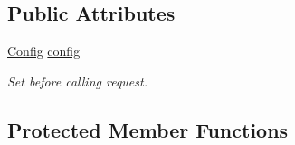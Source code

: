 \subsection*{Public Attributes}
\begin{DoxyCompactItemize}
\item 
\mbox{\label{classhttp_1_1_client_base_a3810388b54d19e5f020d3eca8d08d470}} 
\hyperlink{classhttp_1_1_client_base_1_1_config}{Config} \hyperlink{classhttp_1_1_client_base_a3810388b54d19e5f020d3eca8d08d470}{config}
\begin{DoxyCompactList}\small\item\em Set before calling request. \end{DoxyCompactList}\end{DoxyCompactItemize}
\subsection*{Protected Member Functions}
